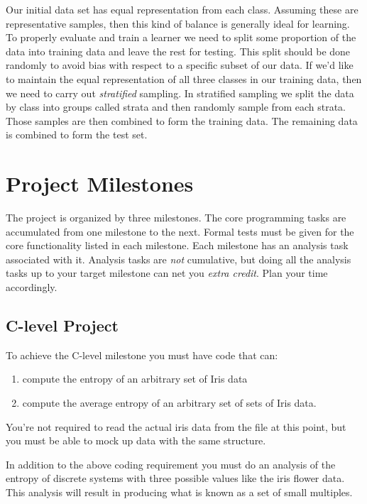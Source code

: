 \documentclass[]{tufte-handout}
\begin{document}
Our initial data set has equal representation from each class. Assuming these are representative samples, then this kind of balance is generally ideal for learning. To properly evaluate and train a learner we need to split some proportion of the data into training data and leave the rest for testing. This split should be done randomly to avoid bias with respect to a specific subset of our data. If we'd like to maintain the equal representation of all three classes in our training data, then we need to carry out \textit{stratified} sampling. In stratified sampling we split the data by class into groups called strata and then randomly sample from each strata. Those samples are then combined to form the training data. The remaining data is combined to form the test set.

\section*{Project Milestones}

The project is organized by three milestones. The core programming tasks are accumulated from one milestone to the next. Formal tests must be given for the core functionality listed in each milestone. Each milestone has an analysis task associated with it.  Analysis tasks are \textit{not} cumulative, but doing all the analysis tasks up to your target milestone can net you \textit{extra credit}.  Plan your time accordingly.

\subsection*{C-level Project}

To achieve the C-level milestone you must have code that can:
\begin{enumerate}
  \item compute the entropy of an arbitrary set of Iris data
  \item compute the average entropy of an arbitrary set of sets of Iris data.
\end{enumerate}
You're not required to read the actual iris data from the file at this point, but you must be able to mock up data with the same structure.

In addition to the above coding requirement you must do an analysis of the entropy of discrete systems with three possible values like the iris flower data. This analysis will result in producing what is known as a set of small multiples.
\end{document}

